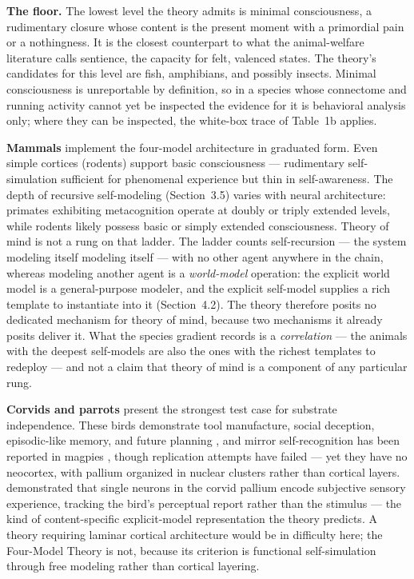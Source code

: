\documentclass[12pt]{article}
\begin{document}
\textbf{The floor.} The lowest level the theory admits is minimal consciousness, a rudimentary closure whose content is the present moment with a primordial pain or a nothingness. It is the closest counterpart to what the animal-welfare literature calls sentience, the capacity for felt, valenced states. The theory's candidates for this level are fish, amphibians, and possibly insects. Minimal consciousness is unreportable by definition, so in a species whose connectome and running activity cannot yet be inspected the evidence for it is behavioral analysis only; where they can be inspected, the white-box trace of Table~1b applies.

\textbf{Mammals} implement the four-model architecture in graduated form. Even simple cortices (rodents) support basic consciousness --- rudimentary self-simulation sufficient for phenomenal experience but thin in self-awareness. The depth of recursive self-modeling (Section~3.5) varies with neural architecture: primates exhibiting metacognition operate at doubly or triply extended levels, while rodents likely possess basic or simply extended consciousness. Theory of mind is not a rung on that ladder. The ladder counts self-recursion --- the system modeling itself modeling itself --- with no other agent anywhere in the chain, whereas modeling another agent is a \emph{world-model} operation: the explicit world model is a general-purpose modeler, and the explicit self-model supplies a rich template to instantiate into it (Section~4.2). The theory therefore posits no dedicated mechanism for theory of mind, because two mechanisms it already posits deliver it. What the species gradient records is a \emph{correlation} --- the animals with the deepest self-models are also the ones with the richest templates to redeploy --- and not a claim that theory of mind is a component of any particular rung.

\textbf{Corvids and parrots} present the strongest test case for substrate independence. These birds demonstrate tool manufacture, social deception, episodic-like memory, and future planning \citep{Gunturkun2016}, and mirror self-recognition has been reported in magpies \citep{Prior2008}, though replication attempts have failed --- yet they have no neocortex, with pallium organized in nuclear clusters rather than cortical layers. \citet{Nieder2020} demonstrated that single neurons in the corvid pallium encode subjective sensory experience, tracking the bird's perceptual report rather than the stimulus --- the kind of content-specific explicit-model representation the theory predicts. A theory requiring laminar cortical architecture would be in difficulty here; the Four-Model Theory is not, because its criterion is functional self-simulation through free modeling rather than cortical layering.
\end{document}

